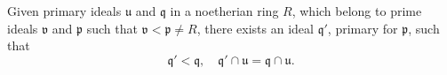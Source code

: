 Given primary ideals $\mathfrak{u}$ and $\mathfrak{q}$ in a noetherian ring $R$, which belong to prime ideals $\mathfrak{v}$ and $\mathfrak{p}$ such that $\mathfrak{v} < \mathfrak{p} \neq R$, there exists an ideal $\mathfrak{q}'$, primary for $\mathfrak{p}$, such that
$$\mathfrak{q}' < \mathfrak{q}, \quad \mathfrak{q}' \cap \mathfrak{u} = \mathfrak{q} \cap \mathfrak{u}.$$
